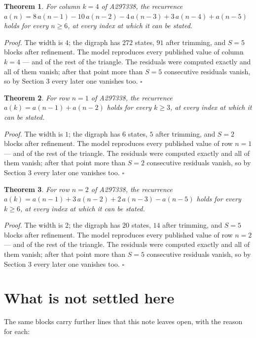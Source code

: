 \documentclass[11pt]{article}
\newtheorem{theorem}{Theorem}
\theoremstyle{definition}
\begin{document}
\begin{theorem} For column $k = 4$ of A297338, the recurrence $a(n) = 8\,a(n-1) - 10\,a(n-2) - 4\,a(n-3) + 3\,a(n-4) + a(n-5)$ holds for every $n \ge 6$, at every index at which it can be stated.\end{theorem}

{\itshape Proof.} The width is $4$; the digraph has $272$ states, $91$ after trimming, and $S = 5$ blocks after refinement. The model reproduces every published value of column $k = 4$ --- and of the rest of the triangle. The residuals were computed exactly and all of them vanish; after that point more than $S = 5$ consecutive residuals vanish, so by Section 3 every later one vanishes too. $\square$

\begin{theorem} For row $n = 1$ of A297338, the recurrence $a(k) = a(n-1) + a(n-2)$ holds for every $k \ge 3$, at every index at which it can be stated.\end{theorem}

{\itshape Proof.} The width is $1$; the digraph has $6$ states, $5$ after trimming, and $S = 2$ blocks after refinement. The model reproduces every published value of row $n = 1$ --- and of the rest of the triangle. The residuals were computed exactly and all of them vanish; after that point more than $S = 2$ consecutive residuals vanish, so by Section 3 every later one vanishes too. $\square$

\begin{theorem} For row $n = 2$ of A297338, the recurrence $a(k) = a(n-1) + 3\,a(n-2) + 2\,a(n-3) - a(n-5)$ holds for every $k \ge 6$, at every index at which it can be stated.\end{theorem}

{\itshape Proof.} The width is $2$; the digraph has $20$ states, $14$ after trimming, and $S = 5$ blocks after refinement. The model reproduces every published value of row $n = 2$ --- and of the rest of the triangle. The residuals were computed exactly and all of them vanish; after that point more than $S = 5$ consecutive residuals vanish, so by Section 3 every later one vanishes too. $\square$

\section{What is not settled here}

The same blocks carry further lines that this note leaves open, with the reason for each:
\end{document}
